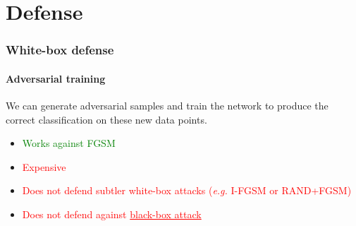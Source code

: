 \documentclass[9pt]{beamer}
\begin{document}
\section{Defense}



\begin{frame}
  \frametitle{White-box defense}

  \framesubtitle{Adversarial training}

  We can generate adversarial samples and train the network to produce
  the correct classification on these new data points.

  \medskip

  \begin{itemize}
  \item \textcolor{green}{Works against FGSM}
  \item \textcolor{red}{Expensive}
  \item \textcolor{red}{Does not defend subtler white-box
    attacks (\textit{e.g.} I-FGSM or RAND+FGSM)}
  \item \textcolor{red}{Does not defend against \underline{black-box
      attack}}
  \end{itemize}
\end{frame}
\end{document}
